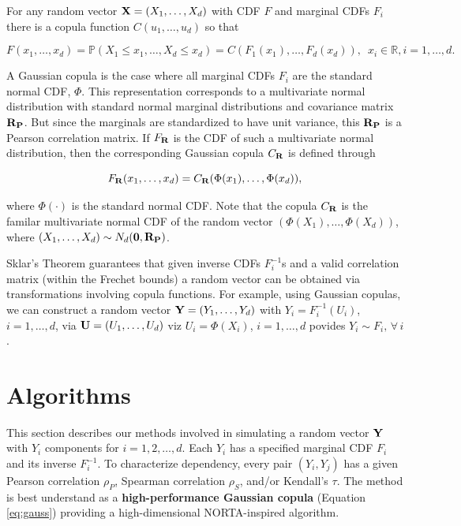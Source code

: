 \documentclass[]{article}
\begin{document}
For any random vector \({\bf X}=(X_1, \ldots, X_d)\) with CDF \(F\) and marginal CDFs \(F_i\) there is a copula function
\(C(u_1, \ldots, u_d)\) so that

\[
F(x_1, \ldots,x_d) = \mathbb P(X_1\leq x_1, \ldots,X_d\leq x_d) = C(F_1(x_1), \ldots, F_d(x_d)), \,\,\, x_i\in \mathbb R, i=1,\ldots,d. 
\]

A Gaussian copula is the case where all marginal CDFs \(F_i\) are the standard normal CDF, \(\Phi\).
This representation corresponds to a multivariate normal distribution with standard normal marginal distributions and covariance matrix \({\bf R_P}\).
But since the marginals are standardized to have unit variance, this \({\bf R_P}\) is a Pearson correlation matrix.
If \(F_{{\bf R}}\) is the CDF of such a multivariate normal distribution, then the corresponding Gaussian copula \(C_{{\bf R}}\) is defined through

\begin{equation}
\label{eq:gauss}
F_{{\bf R}}(x_1, \ldots, x_d) = C_{{\bf R}}(\Phi(x_1), \ldots, \Phi(x_d)),
\end{equation}

where \(\Phi(\cdot)\) is the standard normal CDF.
Note that the copula \(C_{{\bf R}}\) is the familar multivariate normal CDF of the random vector \((\Phi(X_1), \ldots, \Phi(X_d))\), where \((X_1, \ldots, X_d) \sim N_d({\bf 0}, {\bf R_P})\).

Sklar's Theorem \citep{Sklar1959, Ubeda-Flores2017} guarantees that given inverse CDFs \(F_i^{-1}\)s and a valid correlation matrix (within the Frechet bounds) a random vector can be obtained via transformations involving copula functions.
For example, using Gaussian copulas, we can construct a random vector \({\bf Y} = (Y_1, \ldots, Y_d)\) with \(Y_i=F_i^{-1}(U_i)\), \(i=1, \ldots, d\), via \({\bf U} = (U_1, \ldots, U_d)\) viz \(U_i=\Phi(X_i)\), \(i=1, \ldots, d\) povides \(Y_i \sim F_i, \, \forall \, i\) .

\hypertarget{algorithms}{%
\section{Algorithms}\label{algorithms}}

This section describes our methods involved in simulating a random vector \(\bf Y\) with \(Y_i\) components for \(i=1,2,\ldots,d\).
Each \(Y_i\) has a specified marginal CDF \(F_i\) and its inverse \(F^{-1}_i\).
To characterize dependency, every pair \((Y_i, Y_j)\) has a given Pearson correlation \(\rho_P\), Spearman correlation \(\rho_S\), and/or Kendall's \(\tau\).
The method is best understand as a \textbf{high-performance Gaussian copula} (Equation \eqref{eq:gauss}) providing a high-dimensional NORTA-inspired algorithm.
\end{document}
